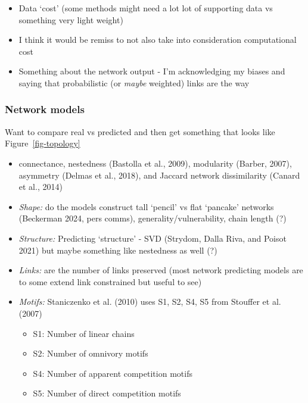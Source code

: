 \documentclass[
  letterpaper,
  DIV=11,
  numbers=noendperiod]{scrartcl}
\providecommand{\tightlist}{%
  \setlength{\itemsep}{0pt}\setlength{\parskip}{0pt}}\usepackage{longtable,booktabs,array}
\begin{document}
\begin{itemize}
\tightlist
\item
  Data `cost' (some methods might need a lot lot of supporting data vs
  something very light weight)
\item
  I think it would be remiss to not also take into consideration
  computational cost
\item
  Something about the network output - I'm acknowledging my biases and
  saying that probabilistic (or \emph{maybe} weighted) links are the way
\end{itemize}

\subsubsection{Network models}\label{network-models}

Want to compare real vs predicted and then get something that looks like
Figure~\ref{fig-topology}

\begin{itemize}
\item
  connectance, nestedness (Bastolla et al., 2009), modularity (Barber,
  2007), asymmetry (Delmas et al., 2018), and Jaccard network
  dissimilarity (Canard et al., 2014)
\item
  \emph{Shape:} do the models construct tall `pencil' vs flat `pancake'
  networks (Beckerman 2024, pers comms), generality/vulnerability, chain
  length (?)
\item
  \emph{Structure:} Predicting `structure' - SVD (Strydom, Dalla Riva,
  and Poisot 2021) but maybe something like nestedness as well (?)
\item
  \emph{Links:} are the number of links preserved (most network
  predicting models are to some extend link constrained but useful to
  see)
\item
  \emph{Motifs:} Staniczenko et al. (2010) uses S1, S2, S4, S5 from
  Stouffer et al. (2007)

  \begin{itemize}
  \item
    S1: Number of linear chains
  \item
    S2: Number of omnivory motifs
  \item
    S4: Number of apparent competition motifs
  \item
    S5: Number of direct competition motifs
  \end{itemize}
\end{itemize}
\end{document}
